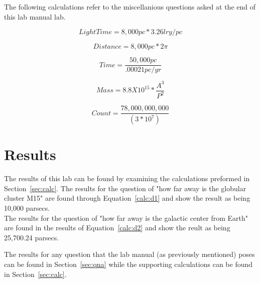 \documentclass{article}
\begin{document}
The following calculations refer to the miscellanious questions asked at the end
of this lab manual lab.

\begin{equation}
\label{calc:m1}
Light Time = 8,000 pc * 3.26 lry/pc
\end{equation}

\begin{equation}
\label{calc:m2}
Distance = 8,000pc * 2\pi
\end{equation}

\begin{equation}
\label{calc:m3}
Time = \frac{50,000pc}{.00021pc/yr}
\end{equation}

\begin{equation}
\label{calc:m4}
Mass = 8.8X10^{15}*\frac{A^3}{P^2}
\end{equation}

\begin{equation}
\label{calc:m5}
Count = \frac{78,000,000,000}{(3*10^7)}
\end{equation}


\section{Results}

The results of this lab can be found by examining the calculations preformed in 
Section~\ref{sec:calc}. The results for the question of "how far away is the globular
cluster M15" are found through Equation~\ref{calc:d1} and show the result as being
10,000 parsecs.\\

The results for the question of "how far away is the galactic center from Earth"
are found in the results of Equation~\ref{calc:d2} and show the reult as being
25,700.24 parsecs.

The results for any question that the lab manual (as previously mentioned) poses
can be found in Section~\ref{sec:qna} while the supporting calculations can be 
found in Section~\ref{sec:calc}.

\end{document}
